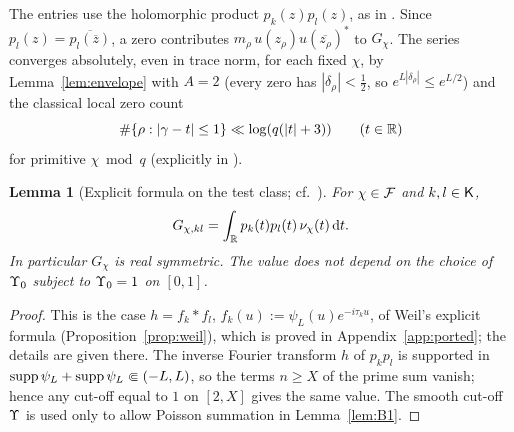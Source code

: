 \documentclass[11pt]{amsart}
\newtheorem{lemma}[theorem]{Lemma}
\theoremstyle{definition}
\theoremstyle{remark}
\numberwithin{equation}{section}
\begin{document}
The entries use the holomorphic product $p_k(z)p_l(z)$, as in \cite[(4.6)]{HY26}. Since $p_l(z)=\overline{p_l(\overline z)}$, a zero contributes $m_\rho\,u(z_\rho)u(\overline{z_\rho})^*$ to $G_\chi$. The series converges absolutely, even in trace norm, for each fixed $\chi$, by Lemma~\ref{lem:envelope} with $A=2$ (every zero has $|\delta_\rho|<\frac12$, so $e^{L|\delta_\rho|}\le e^{L/2}$) and the classical local zero count
\begin{equation}\label{eq:localcount}
\#\{\rho:|\gamma-t|\le1\}\ll\log(q(|t|+3))\qquad(t\in\mathbb R)
\end{equation}
for primitive $\chi\bmod q$ \cite[Ch.~16]{Dav} (explicitly in \cite{BMOR21}).

\begin{lemma}[Explicit formula on the test class; cf.\ {\cite[Prop.~4.1, Lemma~4.2]{HY26}}]\label{lem:explicit}
For $\chi\in\mathcal F$ and $k,l\in\mathsf K$,
\[
G_{\chi,kl}=\int_\mathbb R p_k(t)p_l(t)\,\nu_\chi(t)\,\mathrm d t .
\]
In particular $G_\chi$ is real symmetric. The value does not depend on the choice of $\Upsilon_0$ subject to $\Upsilon_0=1$ on $[0,1]$.
\end{lemma}
\begin{proof}
This is the case $h=f_k*f_l$, $f_k(u):=\psi_L(u)e^{-i\tau_ku}$, of Weil's explicit formula (Proposition~\ref{prop:weil}), which is proved in Appendix~\ref{app:ported}; the details are given there. The inverse Fourier transform $h$ of $p_kp_l$ is supported in $\operatorname{supp}\psi_L+\operatorname{supp}\psi_L\Subset(-L,L)$, so the terms $n\ge X$ of the prime sum vanish; hence any cut-off equal to $1$ on $[2,X]$ gives the same value. The smooth cut-off $\Upsilon$ is used only to allow Poisson summation in Lemma~\ref{lem:B1}.
\end{proof}
\end{document}
